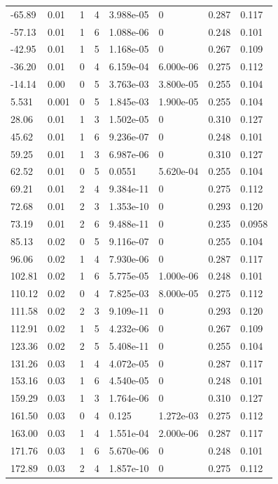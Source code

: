\documentclass[preview]{standalone}
\begin{document}
{{\begin{tabular}{L{1.2cm}C{1.2cm} C{0.3cm}C{0.5cm} C{1.4cm}C{1.4cm} C{1.4cm}C{1.4cm}}
  -65.89  &  0.01  & 1     &  4 &  3.988e-05  & 0  & 0.287 &  0.117   \\ 
  -57.13  &  0.01  & 1     &  6 &  1.088e-06  & 0  & 0.248 &  0.101   \\ 
  -42.95  &  0.01  & 1     &  5 &  1.168e-05  & 0  & 0.267 &  0.109   \\ 
  -36.20  &  0.01  & 0     &  4 &  6.159e-04  & 6.000e-06  & 0.275 &  0.112   \\ 
  -14.14  &  0.00  & 0     &  5 &  3.763e-03  & 3.800e-05  & 0.255 &  0.104   \\ 
  5.531  &  0.001  & 0     &  5 &  1.845e-03  & 1.900e-05  & 0.255 &  0.104   \\ 
  28.06  &  0.01  & 1     &  3 &  1.502e-05  & 0  & 0.310 &  0.127   \\ 
  45.62  &  0.01  & 1     &  6 &  9.236e-07  & 0  & 0.248 &  0.101   \\ 
  59.25  &  0.01  & 1     &  3 &  6.987e-06  & 0  & 0.310 &  0.127   \\ 
  62.52  &  0.01  & 0     &  5 &  0.0551  & 5.620e-04  & 0.255 &  0.104   \\ 
  69.21  &  0.01  & 2     &  4 &  9.384e-11  & 0  & 0.275 &  0.112   \\ 
  72.68  &  0.01  & 2     &  3 &  1.353e-10  & 0  & 0.293 &  0.120   \\ 
  73.19  &  0.01  & 2     &  6 &  9.488e-11  & 0  & 0.235 &  0.0958   \\ 
  85.13  &  0.02  & 0     &  5 &  9.116e-07  & 0  & 0.255 &  0.104   \\ 
  96.06  &  0.02  & 1     &  4 &  7.930e-06  & 0  & 0.287 &  0.117   \\ 
  102.81  &  0.02  & 1     &  6 &  5.775e-05  & 1.000e-06  & 0.248 &  0.101   \\ 
  110.12  &  0.02  & 0     &  4 &  7.825e-03  & 8.000e-05  & 0.275 &  0.112   \\ 
  111.58  &  0.02  & 2     &  3 &  9.109e-11  & 0  & 0.293 &  0.120   \\ 
  112.91  &  0.02  & 1     &  5 &  4.232e-06  & 0  & 0.267 &  0.109   \\ 
  123.36  &  0.02  & 2     &  5 &  5.408e-11  & 0  & 0.255 &  0.104   \\ 
  131.26  &  0.03  & 1     &  4 &  4.072e-05  & 0  & 0.287 &  0.117   \\ 
  153.16  &  0.03  & 1     &  6 &  4.540e-05  & 0  & 0.248 &  0.101   \\ 
  159.29  &  0.03  & 1     &  3 &  1.764e-06  & 0  & 0.310 &  0.127   \\ 
  161.50  &  0.03  & 0     &  4 &  0.125  & 1.272e-03  & 0.275 &  0.112   \\ 
  163.00  &  0.03  & 1     &  4 &  1.551e-04  & 2.000e-06  & 0.287 &  0.117   \\ 
  171.76  &  0.03  & 1     &  6 &  5.670e-06  & 0  & 0.248 &  0.101   \\ 
  172.89  &  0.03  & 2     &  4 &  1.857e-10  & 0  & 0.275 &  0.112   \\ 
\hline 
\end{tabular} 

}}
\end{document}
